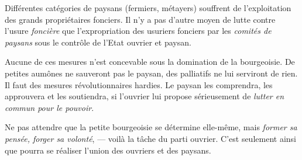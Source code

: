 \documentclass[french,twoside]{book} %
\begin{document}
Différentes catégories de paysans (fermiers, métayers) souffrent de l’exploitation des grands propriétaires fonciers. Il n’y a pas d’autre moyen de lutte contre l’usure \emph{foncière} que l’expropriation des usuriers fonciers par les \emph{comités de paysans} sous le contrôle de l’Etat ouvrier et paysan.\par
Aucune de ces mesures n’est concevable sous la domination  de la bourgeoisie. De petites aumônes ne sauveront pas le paysan, des palliatifs ne lui serviront de rien. Il faut des mesures révolutionnaires hardies. Le paysan les comprendra, les approuvera et les soutiendra, si l’ouvrier lui propose sérieusement de \emph{lutter en commun pour le pouvoir}.\par
Ne pas attendre que la petite bourgeoisie se détermine elle-même, mais \emph{former sa pensée, forger sa volonté}, — voilà la tâche du parti ouvrier. C’est seulement ainsi que pourra se réaliser l’union des ouvriers et des paysans.
\end{document}
